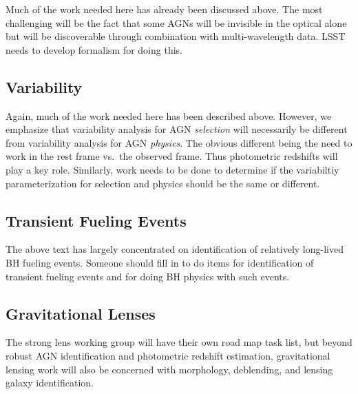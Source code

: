 Much of the work needed here has already been discussed above.  The most challenging will be the fact that some AGNs will be invisible in the optical alone but will be discoverable through combination with multi-wavelength data.  LSST needs to develop formalism for doing this.

\subsection{Variability}

Again, much of the work needed here has been described above.  However, we emphasize that variability analysis for AGN {\em selection} will necessarily be different from variability analysis for AGN {\em physics}.  The obvious different being the need to work in the rest frame vs.\ the observed frame.  Thus photometric redshifts will play a key role.  Similarly, work needs to be done to determine if the variabiltiy parameterization for selection and physics should be the same or different.


\subsection{Transient Fueling Events}

The above text has largely concentrated on identification of relatively long-lived BH fueling events.  Someone should fill in to do items for identification of transient fueling events and for doing BH physics with such events.

\subsection{Gravitational Lenses}

The strong lens working group will have their own road map task list, but beyond robust AGN identification and photometric redshift estimation, gravitational lensing work will also be concerned with morphology, deblending, and lensing galaxy identification.









